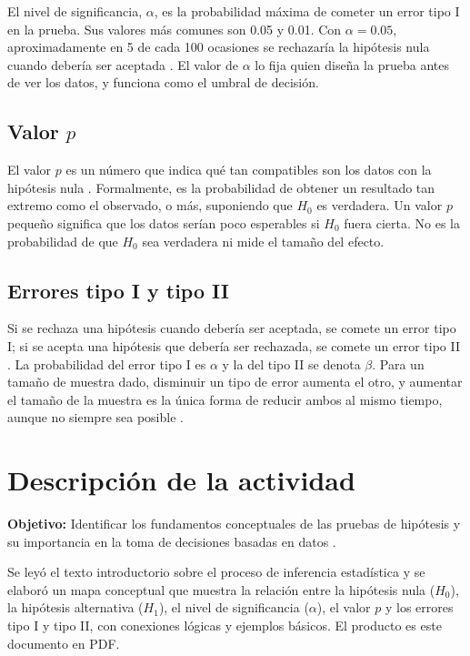 \documentclass[11pt,letterpaper]{article}
\begin{document}
El nivel de significancia, $\alpha$, es la probabilidad máxima de cometer un error tipo I en la prueba. Sus valores más comunes son 0.05 y 0.01. Con $\alpha = 0.05$, aproximadamente en 5 de cada 100 ocasiones se rechazaría la hipótesis nula cuando debería ser aceptada \parencite{tecnm2026_documento_fuente,spiegel2014}. El valor de $\alpha$ lo fija quien diseña la prueba antes de ver los datos, y funciona como el umbral de decisión.

\subsection{Valor $p$}

El valor $p$ es un número que indica qué tan compatibles son los datos con la hipótesis nula \parencite{tecnm2026_documento_fuente}. Formalmente, es la probabilidad de obtener un resultado tan extremo como el observado, o más, suponiendo que $H_0$ es verdadera. Un valor $p$ pequeño significa que los datos serían poco esperables si $H_0$ fuera cierta. No es la probabilidad de que $H_0$ sea verdadera ni mide el tamaño del efecto.

\subsection{Errores tipo I y tipo II}

Si se rechaza una hipótesis cuando debería ser aceptada, se comete un error tipo I; si se acepta una hipótesis que debería ser rechazada, se comete un error tipo II \parencite{tecnm2026_documento_fuente}. La probabilidad del error tipo I es $\alpha$ y la del tipo II se denota $\beta$. Para un tamaño de muestra dado, disminuir un tipo de error aumenta el otro, y aumentar el tamaño de la muestra es la única forma de reducir ambos al mismo tiempo, aunque no siempre sea posible \parencite{tecnm2026_documento_fuente}.

\section{Descripción de la actividad}

\textbf{Objetivo:} Identificar los fundamentos conceptuales de las pruebas de hipótesis y su importancia en la toma de decisiones basadas en datos \parencite{tecnm2026_documento_fuente}.

Se leyó el texto introductorio sobre el proceso de inferencia estadística y se elaboró un mapa conceptual que muestra la relación entre la hipótesis nula ($H_0$), la hipótesis alternativa ($H_1$), el nivel de significancia ($\alpha$), el valor $p$ y los errores tipo I y tipo II, con conexiones lógicas y ejemplos básicos. El producto es este documento en PDF.
\end{document}

